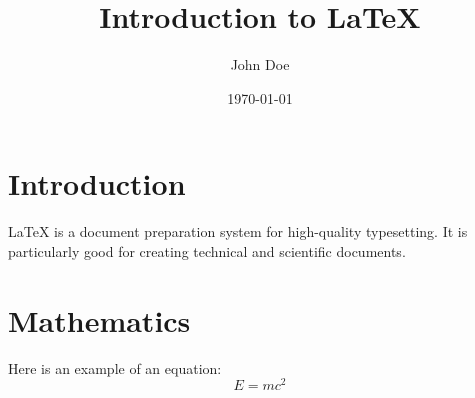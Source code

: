 \documentclass{article}
\begin{document}
\title{Introduction to LaTeX}
\author{John Doe}
\date{\today}

\maketitle

\section{Introduction}
LaTeX is a document preparation system for high-quality typesetting. It is particularly good for creating technical and scientific documents.

\section{Mathematics}
Here is an example of an equation:
\[
E = mc^2
\]
\end{document}
